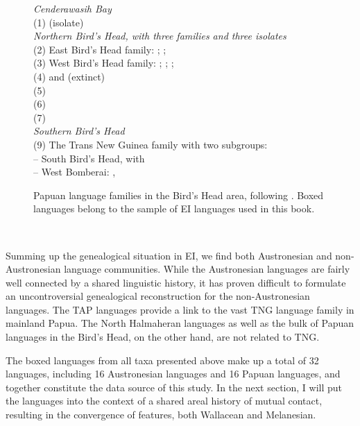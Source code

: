 \begin{figure}[ht]
\begin{footnotesize}
\textit{Cenderawasih Bay} \\
(1)  (isolate) \\

\textit{Northern Bird’s Head, with three families and three isolates} \\
(2) East Bird’s Head family: ; ;  \\
(3) West Bird’s Head family: ; ; ;  \\
(4)  and (extinct)  \\
(5)  \\
(6)  \\
(7)  \\

\textit{Southern Bird’s Head} \\
(9) The Trans New Guinea family with two subgroups: \\
– South Bird’s Head, with  \\
– West Bomberai: ,  \\
\end{footnotesize}
\caption[The Papuan languages of the Bird's Head]{Papuan language families in the Bird's Head area, following \citet{klamer2008east}. Boxed languages belong to the sample of EI languages used in this book.}
\end{figure}
\

Summing up the genealogical situation in EI, we find both Austronesian and non-Austronesian language communities. While the Austronesian languages are fairly well connected by a shared linguistic history, it has proven difficult to formulate an uncontroversial genealogical reconstruction for the non-Austronesian languages. The TAP languages provide a link to the vast TNG language family in mainland Papua. The North Halmaheran languages as well as the bulk of Papuan languages in the Bird's Head, on the other hand, are not related to TNG. 

The boxed languages from all taxa presented above make up a total of 32 languages, including 16 Austronesian languages and 16 Papuan languages, and together constitute the data source of this study. In the next section, I will put the languages into the context of a shared areal history of mutual contact, resulting in the convergence of features, both Wallacean and Melanesian.

